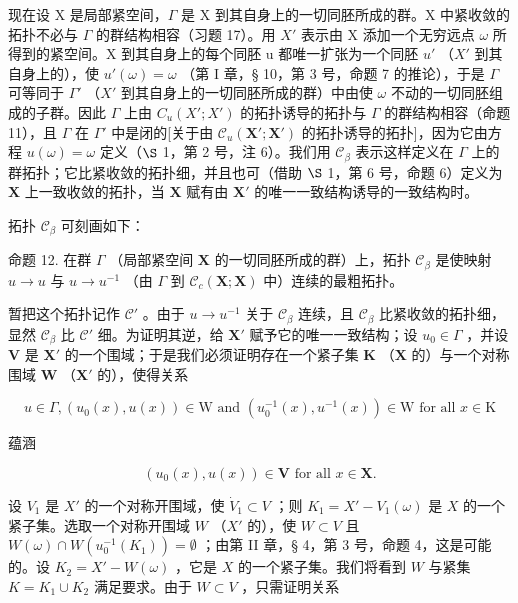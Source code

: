 现在设 X 是局部紧空间，\(\Gamma\) 是 X 到其自身上的一切同胚所成的群。X 中紧收敛的拓扑不必与 \(\Gamma\) 的群结构相容（习题 17）。用 \(X'\) 表示由 X 添加一个无穷远点 \(\omega\) 所得到的紧空间。X 到其自身上的每个同胚 u 都唯一扩张为一个同胚 \(u'\) （\(X'\) 到其自身上的），使 \(u'(\omega) = \omega\) （第 I 章，§ 10，第 3 号，命题 7 的推论），于是 \(\Gamma\) 可等同于 \(\Gamma'\) （\(X'\) 到其自身上的一切同胚所成的群）中由使 \(\omega\) 不动的一切同胚组成的子群。因此 \(\Gamma\) 上由 \(C_u(X'; X')\) 的拓扑诱导的拓扑与 \(\Gamma\) 的群结构相容（命题 11），且 \(\Gamma\) 在 \(\Gamma'\) 中是闭的{[}关于由 \(\mathcal{C}_u(\mathbf{X}';\mathbf{X}')\) 的拓扑诱导的拓扑{]}，因为它由方程 \(u(\omega)=\omega\) 定义（\(\S\) 1，第 2 号，注 6）。我们用 \(\mathcal{C}_{\beta}\) 表示这样定义在 \(\Gamma\) 上的群拓扑；它比紧收敛的拓扑细，并且也可（借助 \(\S\) 1，第 6 号，命题 6）定义为 \(\mathbf{X}\) 上一致收敛的拓扑，当 \(\mathbf{X}\) 赋有由 \(\mathbf{X}'\) 的唯一一致结构诱导的一致结构时。

拓扑 \(\mathcal{C}_{\beta}\) 可刻画如下：

命题 12. 在群 \(\Gamma\) （局部紧空间 \(\mathbf{X}\) 的一切同胚所成的群）上，拓扑 \(\mathcal{C}_{\beta}\) 是使映射 \(u \to u\) 与 \(u \to u^{-1}\) （由 \(\Gamma\) 到 \(\mathcal{C}_c(\mathbf{X}; \mathbf{X})\) 中）连续的最粗拓扑。

暂把这个拓扑记作 \(\mathcal{C}'\) 。由于 \(u \to u^{-1}\) 关于 \(\mathcal{C}_{\beta}\) 连续，且 \(\mathcal{C}_{\beta}\) 比紧收敛的拓扑细，显然 \(\mathcal{C}_{\beta}\) 比 \(\mathcal{C}'\) 细。为证明其逆，给 \(\mathbf{X}'\) 赋予它的唯一一致结构；设 \(u_0 \in \Gamma\) ，并设 \(\mathbf{V}\) 是 \(\mathbf{X}'\) 的一个围域；于是我们必须证明存在一个紧子集 \(\mathbf{K}\) （\(\mathbf{X}\) 的）与一个对称围域 \(\mathbf{W}\) （\(\mathbf{X}'\) 的），使得关系

\[
u \in \Gamma , (u _ {0} (x), u (x)) \in \mathrm{W} \text {   and   } (u _ {0} ^ {- 1} (x), u ^ {- 1} (x)) \in \mathrm{W} \text {   for   all   } x \in \mathrm{K}
\]

蕴涵

\[
(u _ {0} (x), u (x)) \in \mathbf {V} \text {   for   all   } x \in \mathbf {X}.
\]

设 \(V_1\) 是 \(X'\) 的一个对称开围域，使 \(\dot{V}_1 \subset V\) ；则 \(K_1 = X' - V_1(\omega)\) 是 \(X\) 的一个紧子集。选取一个对称开围域 \(W\) （\(X'\) 的），使 \(W \subset V\) 且 \(W(\omega) \cap W(u_0^{-1}(K_1)) = \emptyset\) ；由第 II 章，§ 4，第 3 号，命题 4，这是可能的。设 \(K_2 = X' - W(\omega)\) ，它是 \(X\) 的一个紧子集。我们将看到 \(W\) 与紧集 \(K = K_1 \cup K_2\) 满足要求。由于 \(W \subset V\) ，只需证明关系

